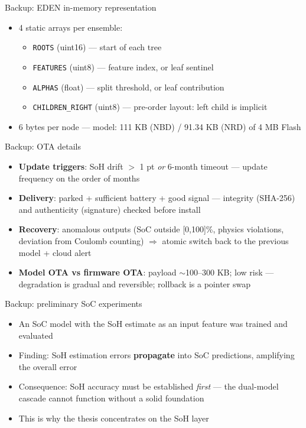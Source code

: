\documentclass[11pt,aspectratio=169]{beamer}
\begin{document}
\begin{frame}[fragile]{Backup: EDEN in-memory representation}
  \begin{itemize}
    \item 4 static arrays per ensemble:
    \begin{itemize}
      \item \texttt{ROOTS} (uint16) --- start of each tree
      \item \texttt{FEATURES} (uint8) --- feature index, or leaf sentinel
      \item \texttt{ALPHAS} (float) --- split threshold, or leaf contribution
      \item \texttt{CHILDREN\_RIGHT} (uint8) --- pre-order layout: left child is implicit
    \end{itemize}
    \item 6 bytes per node --- model: 111 KB (NBD) / 91.34 KB (NRD) of 4 MB Flash
  \end{itemize}
\end{frame}

\begin{frame}{Backup: OTA details}
  \begin{itemize}
    \item \textbf{Update triggers}: SoH drift $>$ 1 pt \emph{or} 6-month timeout ---
          update frequency on the order of months
    \item \textbf{Delivery}: parked + sufficient battery + good signal ---
          integrity (SHA-256) and authenticity (signature) checked before install
    \item \textbf{Recovery}: anomalous outputs (SoC outside [0,100]\%, physics
          violations, deviation from Coulomb counting) $\Rightarrow$ atomic switch
          back to the previous model + cloud alert
    \item \textbf{Model OTA vs firmware OTA}: payload $\sim$100--300 KB; low risk
          --- degradation is gradual and reversible; rollback is a pointer swap
  \end{itemize}
\end{frame}

\begin{frame}{Backup: preliminary SoC experiments}
  \begin{itemize}
    \item An SoC model with the SoH estimate as an input feature was trained and
          evaluated
    \item Finding: SoH estimation errors \textbf{propagate} into SoC predictions,
          amplifying the overall error
    \item Consequence: SoH accuracy must be established \emph{first} --- the
          dual-model cascade cannot function without a solid foundation
    \item This is why the thesis concentrates on the SoH layer
  \end{itemize}
\end{frame}
\end{document}
